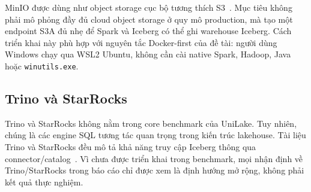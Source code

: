 MinIO được dùng như object storage cục bộ tương thích S3~\cite{minioS3Compatibility}. Mục tiêu không phải mô phỏng đầy đủ cloud object storage ở quy mô production, mà tạo một endpoint S3A đủ nhẹ để Spark và Iceberg có thể ghi warehouse Iceberg. Cách triển khai này phù hợp với nguyên tắc Docker-first của đề tài: người dùng Windows chạy qua WSL2 Ubuntu, không cần cài native Spark, Hadoop, Java hoặc \texttt{winutils.exe}.

\subsection{Trino và StarRocks}

Trino và StarRocks không nằm trong core benchmark của UniLake. Tuy nhiên, chúng là các engine SQL tương tác quan trọng trong kiến trúc lakehouse. Tài liệu Trino và StarRocks đều mô tả khả năng truy cập Iceberg thông qua connector/catalog~\cite{trinoIcebergDocs,starrocksIcebergDocs}. Vì chưa được triển khai trong benchmark, mọi nhận định về Trino/StarRocks trong báo cáo chỉ được xem là định hướng mở rộng, không phải kết quả thực nghiệm.
